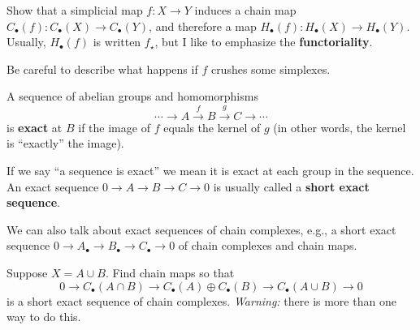 \documentclass[12pt]{pset}
\begin{document}
\begin{problem}
  Show that a simplicial map $f : X \to Y$ induces a chain map $C_\bullet(f) :
  C_\bullet(X) \to C_\bullet(Y)$, and therefore a map $H_\bullet(f) : H_\bullet(X)
  \to H_\bullet(Y)$.  Usually, $H_\bullet(f)$ is written $f_\star$, but I
  like to emphasize the \textbf{functoriality}.

  Be careful to describe what happens if $f$ crushes some simplexes.
\end{problem}

\begin{definition*}
  A sequence of abelian groups and homomorphisms 
  $$\cdots \to A \stackrel{f}{\longrightarrow} B
  \stackrel{g}{\longrightarrow} C \to \cdots$$ is \textbf{exact} at
  $B$ if the image of $f$ equals the kernel of $g$ (in other words,
  the kernel is ``exactly'' the image).

  If we say ``a sequence is exact'' we mean it is exact at each group
  in the sequence.  An exact sequence $0 \to A \to B \to C \to 0$ is
  usually called a \textbf{short exact sequence}.

  We can also talk about exact sequences of chain complexes, e.g., a
  short exact sequence $0 \to A_\bullet \to B_\bullet \to C_\bullet \to 0$ of
  chain complexes and chain maps.
\end{definition*}

\begin{requiredproblem}
  Suppose $X = A \cup B$.  Find chain maps so that
  $$
  0 \to C_\bullet(A \cap B) \to C_\bullet(A) \oplus C_\bullet(B) \to C_\bullet(A
  \cup B) \to 0
  $$
  is a short exact sequence of chain complexes.  \textit{Warning:} there is more than one way to do this.
\end{requiredproblem}
\end{document}
